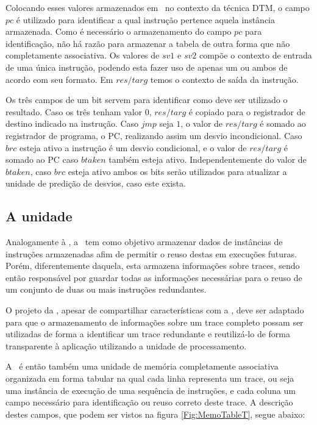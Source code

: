 Colocando esses valores armazenados em \tableg\ no contexto da técnica DTM, o campo $pc$ é utilizado para identificar a qual instrução pertence aquela instância armazenada. Como é necessário o armazenamento do campo $pc$ para identificação, não há razão para armazenar a tabela de outra forma que não completamente associativa. Os valores de $sv1$ e $sv2$ compõe o contexto de entrada de uma única instrução, podendo esta fazer uso de apenas um ou ambos de acordo com seu formato. Em $res/targ$ temos o contexto de saída da instrução.

Os três campos de um bit servem para identificar como deve ser utilizado o resultado. Caso os três tenham valor $0$, $res/targ$ é copiado para o registrador de destino indicado na instrução. Caso $jmp$ seja $1$, o valor de $res/targ$ é somado ao registrador de programa, o PC, realizando assim um desvio incondicional. Caso $brc$ esteja ativo a instrução é um desvio condicional, e o valor de $res/targ$ é somado ao PC caso $btaken$ também esteja ativo. Independentemente do valor de $btaken$, caso $brc$ esteja ativo ambos os bits serão utilizados para atualizar a unidade de predição de desvios, caso este exista.

\subsection{A unidade \tablet}
\label{Fundamentacao:DTMHardware:TableT}

Analogamente à \tableg, a \tablet\ tem como objetivo armazenar dados de instâncias de instruções armazenadas afim de permitir o reuso destas em execuções futuras. Porém, diferentemente daquela, esta armazena informações sobre traces, sendo então responsável por guardar todas as informações necessárias para o reuso de um conjunto de duas ou mais instruções redundantes.

O projeto da \tablet, apesar de compartilhar características com a \tableg, deve ser adaptado para que o armazenamento de informações sobre um trace completo possam ser utilizadas de forma a identificar um trace redundante e reutilizá-lo de forma transparente à aplicação utilizando a unidade de processamento. 

A \tablet\ é então também uma unidade de memória completamente associativa organizada em forma tabular na qual cada linha representa um trace, ou seja uma instância de execução de uma sequência de instruções, e cada coluna um campo necessário para identificação ou reuso correto deste trace. A descrição destes campos, que podem ser vistos na figura \ref{Fig:MemoTableT}, segue abaixo:

